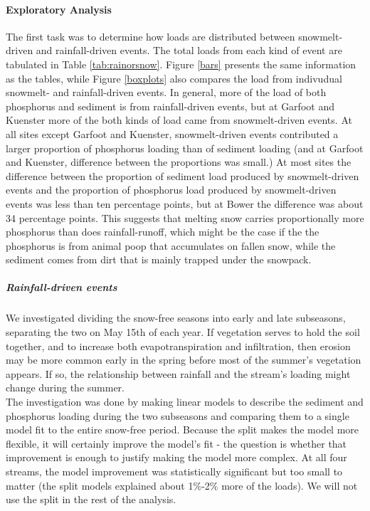 \documentclass[10pt]{article}
\begin{document}
\paragraph{Exploratory Analysis}
The first task was to determine how loads are distributed between snowmelt-driven and rainfall-driven events. The total loads from each kind of event are tabulated in Table \ref{tab:rainorsnow}. Figure \ref{bars} presents the same information as the tables, while Figure \ref{boxplots} also compares the load from indivudual snowmelt- and rainfall-driven events. In general, more of the load of both phosphorus and sediment is from rainfall-driven events, but at Garfoot and Kuenster more of the both kinds of load came from snowmelt-driven events. At all sites except Garfoot and Kuenster, snowmelt-driven events contributed a larger proportion of phosphorus loading than of sediment loading (and at Garfoot and Kuenster, difference between the proportions was small.) At most sites the difference between the proportion of sediment load produced by snowmelt-driven events and the proportion of phosphorus load produced by snowmelt-driven events was less than ten percentage points, but at Bower the difference was about 34 percentage points. This suggests that melting snow carries proportionally more phosphorus than does rainfall-runoff, which might be the case if the the phosphorus is from animal poop that accumulates on fallen snow, while the sediment comes from dirt that is mainly trapped under the snowpack.\\

\subparagraph{Rainfall-driven events}
We investigated dividing the snow-free seasons into early and late subseasons, separating the two on May 15th of each year. If vegetation serves to hold the soil together, and to increase both evapotranspiration and infiltration, then erosion may be more common early in the spring before most of the summer's vegetation appears. If so, the relationship between rainfall and the stream's loading might change during the summer.\\

The investigation was done by making linear models to describe the sediment and phosphorus loading during the two subseasons and comparing them to a single model fit to the entire snow-free period. Because the split makes the model more flexible, it will certainly improve the model's fit - the question is whether that improvement is enough to justify making the model more complex. At all four streams, the model improvement was statistically significant but too small to matter (the split models explained about 1\%-2\% more of the loads). We will not use the split in the rest of the analysis.\\
\end{document}
